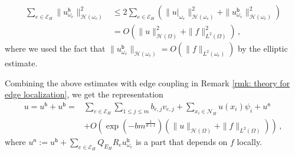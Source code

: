 \documentclass[12pt]{caltech_thesis}
\numberwithin{equation}{section}
\begin{document}
\begin{equation}
\begin{aligned}
    \sum_{e \in \mathcal{E}_H} \|u^\mathsf{h}_{\omega_e}\|_{\mathcal{H}(\omega_e)}^2 &\leq 2\sum_{e \in \mathcal{E}_H} (\|u|_{\omega_e}\|_{\mathcal{H}(\omega_e)}^2 + \|u_{\omega_e}^\mathsf{b}\|_{\mathcal{H}(\omega_e)}^2)\\
    & = O(\|u\|^2_{\mathcal{H}(\Omega)}+\|f\|^2_{L^2(\Omega)})\, ,
\end{aligned}
\end{equation}
where we used the fact that $\|u_{\omega_e}^\mathsf{b}\|_{\mathcal{H}(\omega_e)} = O(\|f\|_{L^2(\omega_e)})$ by the elliptic estimate.

Combining the above  estimates with edge coupling in Remark \ref{rmk: theory for edge localization}, we get the representation
\begin{equation}
\label{eqn: exp representation}
\begin{aligned}
    u = u^{\mathsf{h}}+u^{\mathsf{b}} = &\sum_{e \in \mathcal{E}_H} \sum_{1\leq j \leq m} b_{e,j} v_{e,j} + \sum_{x_i \in \mathcal{N}_H} u(x_i) \psi_i + u^{\mathsf{n}} \\
    &+ O\left(\exp(-bm^{\frac{1}{d+1}})(\|u\|_{\mathcal{H}(\Omega)}+\|f\|_{L^2(\Omega)})\right)\, ,
\end{aligned}
\end{equation}
where $u^\mathsf{n} := u^\mathsf{b} + \sum_{e \in \mathcal{E}_H} Q_{E_H}R_e u^\mathsf{b}_{\omega_e}$ is a part that depends on $f$ locally.
\end{document}
